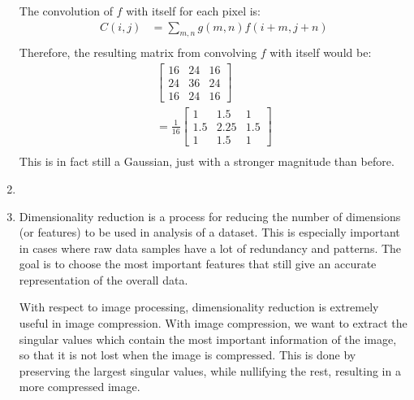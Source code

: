 \documentclass[12pt]{article}
\begin{document}
\begin{enumerate}
	The convolution of $f$ with itself for each pixel is:
	\begin{align*}
		C(i, j) &= \sum_{m, n} g(m, n) f(i + m, j + n) \\
	\end{align*}
	Therefore, the resulting matrix from convolving $f$ with itself would be:
		\begin{align*}
		\begin{bmatrix}  16 & 24 & 16 \\ 24 & 36 & 24 \\ 16 & 24 & 16 \end{bmatrix} \\
		= \frac{1}{16}
		\begin{bmatrix}  1 & 1.5 & 1 \\ 1.5 & 2.25 & 1.5 \\ 1 & 1.5 & 1 \end{bmatrix} \\
	\end{align*}
	This is in fact still a Gaussian, just with a stronger magnitude than before.
	
	\item 
	\item Dimensionality reduction is a process for reducing the number of dimensions (or features) to be used in analysis of a dataset. This is especially important in cases where raw data samples have a lot of redundancy and patterns. The goal is to choose the most important features that still give an accurate representation of the overall data.
	
	With respect to image processing, dimensionality reduction is extremely useful in image compression. With image compression, we want to extract the singular values which contain the most important information of the image, so that it is not lost when the image is compressed. This is done by preserving the largest singular values, while nullifying the rest, resulting in a more compressed image. 
	

\end{enumerate}
\end{document}
